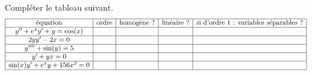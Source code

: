 
\begin{exercice}\label{exostarterST-0022}

Compléter le tableau suivant.
\begin{equation*}
  \begin{array}{|c|c|c|c|c|}
\hline
\text{équation} & \text{ordre}  & \text{homogène ?} & \text{linéaire ?} & \text{si d'ordre 1 : variables séparables ?}\\\hline
y'' +e^xy'+y=\cos(x) &&&&\\\hline
2yy'-2x =0 &&&&\\ \hline
y'''' + \sin(y) =5 &&&& \\ \hline
y'+yx=0 &&&&\\ \hline
\sin(x )y' + e^x y +156x^3 = 0 &&&& \\ \hline
  \end{array}
\end{equation*}


\end{exercice}
